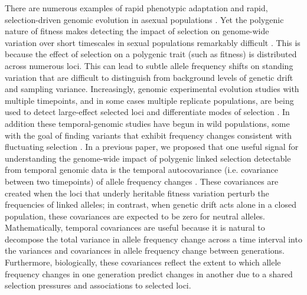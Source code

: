 \documentclass[9pt,twocolumn,twoside]{pnas-new}
\begin{document}
There are numerous examples of rapid phenotypic adaptation
\cite{Grant2011-wk,Grant2006-hj,Reznick1997-mh,Franks2007-dr} and rapid,
selection-driven genomic evolution in asexual populations
\cite{Good2017-om,Bennett1990-bc,Baym2016-kh}.  Yet the polygenic nature of
fitness makes detecting the impact of selection on genome-wide variation over
short timescales in sexual populations remarkably difficult \cite{Latta1998-me,
Pritchard2010-tk,Kemper2014-bx}. This is because the effect of selection on a
polygenic trait (such as fitness) is distributed across numerous loci. This can
lead to subtle allele frequency shifts on standing variation that are difficult
to distinguish from background levels of genetic drift and sampling variance.
Increasingly, genomic experimental evolution studies with multiple timepoints,
and in some cases multiple replicate populations, are being used to detect
large-effect selected loci \cite{Turner2011-sx,Turner2012-bm} and differentiate
modes of selection \cite{Burke2010-tz,Barghi2019-qy,Therkildsen2019-zy}.  In
addition these temporal-genomic studies have begun in wild populations, some
with the goal of finding variants that exhibit frequency changes consistent
with fluctuating selection \cite{Bergland2014-ij,Machado2018-cs}. In a previous
paper, we proposed that one useful signal for understanding the genome-wide
impact of polygenic linked selection detectable from temporal genomic data is
the temporal autocovariance (i.e. covariance between two timepoints) of
allele frequency changes \cite{Buffalo2019-io}. These covariances are created
when the loci that underly heritable fitness variation perturb the frequencies
of linked alleles; in contrast, when genetic drift acts alone in a closed
population, these covariances are expected to be zero for neutral alleles.
Mathematically, temporal covariances are useful because it is natural to
decompose the total variance in allele frequency change across a time interval
into the variances and covariances in allele frequency change between
generations.  Furthermore, biologically, these covariances reflect the extent
to which allele frequency changes in one generation predict changes in another
due to a shared selection pressures and associations to selected loci.
\end{document}
